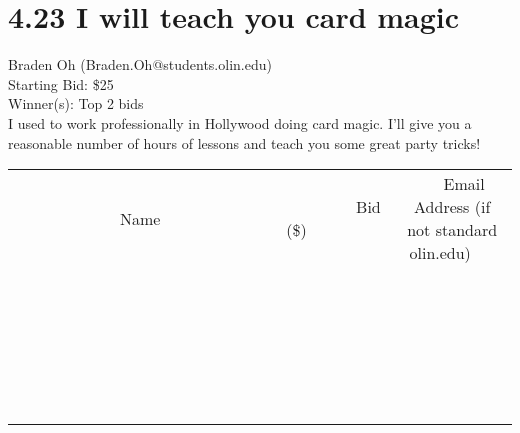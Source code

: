 \documentclass[11pt]{article}
\begin{document}
\section*{4.23 I will teach you card magic}
Braden Oh (Braden.Oh@students.olin.edu) \\
Starting Bid: \$25 \\
Winner(s): 
Top 2 bids \\
I used to work professionally in Hollywood doing card magic. I'll give you a reasonable number of hours of lessons and teach you some great party tricks! \\[6ex]
\begin{tabular}{c c c}
~~~~~~~~~~~~~Name~~~~~~~~~~~~~ & ~~~~~~~~~Bid (\$)~~~~~~~~~ & ~~~Email Address (if not standard olin.edu)~~~ \\
 & & \\
\hline
 & & \\
\hline
 & & \\
\hline
 & & \\
\hline
 & & \\
\hline
 & & \\
\hline
 & & \\
\hline
 & & \\
\hline
 & & \\
\hline
 & & \\
\hline
 & & \\
\hline
 & & \\
\hline
 & & \\
\hline
 & & \\
\hline
 & & \\
\hline
 & & \\
\hline
 & & \\
\hline
 & & \\
\hline
 & & \\
\hline
 & & \\
\hline
 & & \\
\hline
 & & \\
\hline
 & & \\
\hline
 & & \\
\hline
 & & \\
\hline
 & & \\
\hline
\end{tabular}
\clearpage
\end{document}
